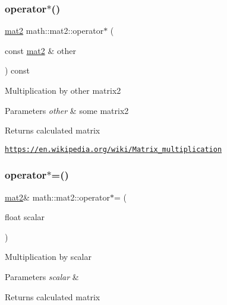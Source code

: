 \subsubsection{\texorpdfstring{operator$\ast$()}{operator*()}\hspace{0.1cm}{\footnotesize\ttfamily [2/2]}}
{\footnotesize\ttfamily \hyperlink{structmath_1_1mat2}{mat2} math\+::mat2\+::operator$\ast$ (\begin{DoxyParamCaption}\item[{const \hyperlink{structmath_1_1mat2}{mat2} \&}]{other }\end{DoxyParamCaption}) const\hspace{0.3cm}{\ttfamily [inline]}}

Multiplication by other matrix2 
\begin{DoxyParams}{Parameters}
{\em other} & some matrix2 \\
\hline
\end{DoxyParams}
\begin{DoxyReturn}{Returns}
calculated matrix
\end{DoxyReturn}
\href{https://en.wikipedia.org/wiki/Matrix_multiplication}{\tt https\+://en.\+wikipedia.\+org/wiki/\+Matrix\+\_\+multiplication} \mbox{\label{structmath_1_1mat2_ab9b8cc4b90979edce51e50228c9b3225}} 
\subsubsection{\texorpdfstring{operator$\ast$=()}{operator*=()}\hspace{0.1cm}{\footnotesize\ttfamily [1/2]}}
{\footnotesize\ttfamily \hyperlink{structmath_1_1mat2}{mat2}\& math\+::mat2\+::operator$\ast$= (\begin{DoxyParamCaption}\item[{float}]{scalar }\end{DoxyParamCaption})\hspace{0.3cm}{\ttfamily [inline]}}

Multiplication by scalar 
\begin{DoxyParams}{Parameters}
{\em scalar} & \\
\hline
\end{DoxyParams}
\begin{DoxyReturn}{Returns}
calculated matrix 
\end{DoxyReturn}
\mbox{\label{structmath_1_1mat2_a908aae05345831bc50a889605c15bd81}} 
